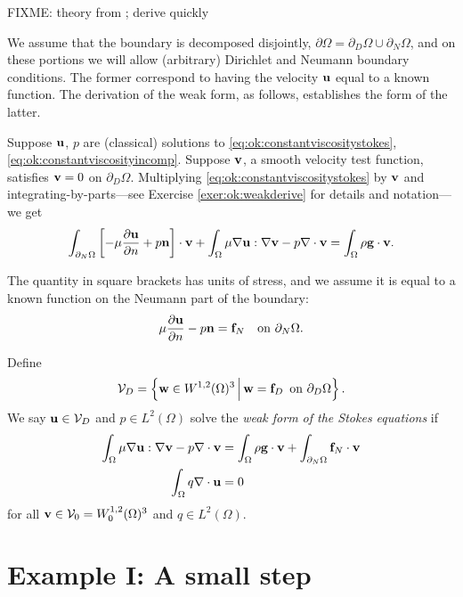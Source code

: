 FIXME: theory from \citep{Braess2007,Elmanetal2005}; derive quickly

We assume that the boundary is decomposed disjointly, $\partial\Omega = \partial_D\Omega \cup \partial_N\Omega$, and on these portions we will allow (arbitrary) Dirichlet and Neumann boundary conditions.  The former correspond to having the velocity $\mathbf{u}$ equal to a known function.  The derivation of the weak form, as follows, establishes the form of the latter.

Suppose $\mathbf{u}$, $p$ are (classical) solutions to \eqref{eq:ok:constantviscositystokes}, \eqref{eq:ok:constantviscosityincomp}.  Suppose $\mathbf{v}$, a smooth velocity test function, satisfies $\mathbf{v}=0$ on $\partial_D\Omega$.  Multiplying \eqref{eq:ok:constantviscositystokes} by $\mathbf{v}$ and integrating-by-parts---see Exercise \ref{exer:ok:weakderive} for details and notation---we get
\begin{equation}
\int_{\partial_N \Omega} \left[- \mu \frac{\partial \mathbf{u}}{\partial n} + p \mathbf{n} \right] \cdot \mathbf{v} + \int_\Omega \mu \nabla \mathbf{u} : \nabla \mathbf{v} - p \nabla\cdot \mathbf{v} = \int_\Omega \rho \mathbf{g} \cdot \mathbf{v}. \label{eq:ok:weakstokeswithboundary}
\end{equation}

The quantity in square brackets has units of stress, and we assume it is equal to a known function on the Neumann part of the boundary:
\begin{equation}
\mu \frac{\partial \mathbf{u}}{\partial n} - p \mathbf{n} = \mathbf{f}_N \quad \text{on } \partial_N \Omega.  \label{eq:ok:neumannbc}
\end{equation}

Define
\begin{equation}
\mathcal{V}_D = \left\{\mathbf{w} \in W^{1,2}(\Omega)^3 \,\Big|\, \mathbf{w} = \mathbf{f}_D \, \text{ on } \partial_D \Omega\right\}. \label{eq:ok:dirichletbc}
\end{equation}
We say $\mathbf{u} \in \mathcal{V}_D$ and $p \in L^2(\Omega)$ solve the \emph{weak form of the Stokes equations} if
\begin{align}
\int_\Omega \mu \nabla \mathbf{u} : \nabla \mathbf{v} - p \nabla\cdot \mathbf{v} &= \int_\Omega \rho \mathbf{g} \cdot \mathbf{v} + \int_{\partial_N \Omega} \mathbf{f}_N \cdot \mathbf{v} \label{eq:ok:weakstokesvelocity} \\
\int_\Omega q \nabla\cdot \mathbf{u} &= 0 \label{eq:ok:weakstokespressure}
\end{align}
for all $\mathbf{v} \in \mathcal{V}_0 = W_0^{1,2}(\Omega)^3$ and $q \in L^2(\Omega)$.


\section{Example I: A small step}

